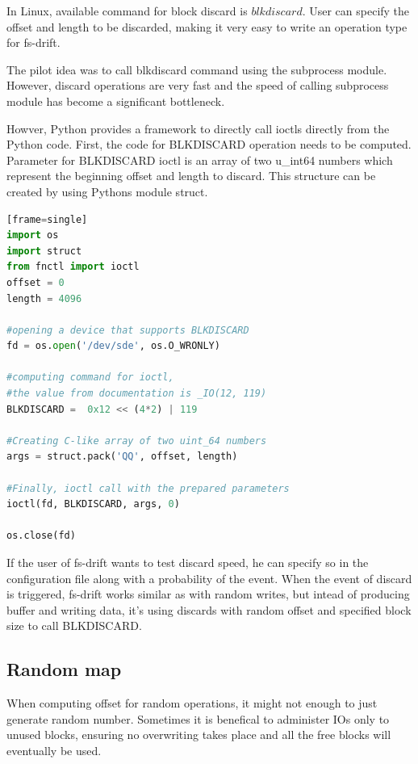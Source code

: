 \documentclass[
  color, %
  table, %
  lof,   %
  lot,   %
]{fithesis3}
\begin{document}
In Linux, available command for block discard is $blkdiscard$. User can specify the offset and length to be discarded, making it very easy to write an operation type for fs-drift.

The pilot idea was to call blkdiscard command using the subprocess module. However, discard operations are very fast and the speed of calling subprocess module has become a significant bottleneck.

Howver, Python provides a framework to directly call ioctls directly from the Python code. First, the code for BLKDISCARD operation needs to be computed. Parameter for BLKDISCARD ioctl is an array of two u\_int64 numbers which represent the beginning offset and length to discard. This structure can be created by using Pythons module struct.





\begin{lstlisting}[language=Python, caption={Using BLKDISCARD ioctl to discard first 4096 bytes from the beginning of the device},label={ex:blkdiscard}][frame=single]
import os
import struct
from fnctl import ioctl
offset = 0
length = 4096

#opening a device that supports BLKDISCARD
fd = os.open('/dev/sde', os.O_WRONLY)    

#computing command for ioctl,
#the value from documentation is _IO(12, 119)
BLKDISCARD =  0x12 << (4*2) | 119

#Creating C-like array of two uint_64 numbers
args = struct.pack('QQ', offset, length)

#Finally, ioctl call with the prepared parameters
ioctl(fd, BLKDISCARD, args, 0)

os.close(fd)
\end{lstlisting}


If the user of fs-drift wants to test discard speed, he can specify so in the configuration file along with a probability of the event. When the event of discard is triggered, fs-drift works similar as with random writes, but intead of producing buffer and writing data, it's using discards with random offset and specified block size to call BLKDISCARD.

\subsection{Random map}
When computing offset for random operations, it might not enough to just generate random number. Sometimes it is benefical to administer IOs only to unused blocks, ensuring no overwriting takes place and all the free blocks will eventually be used.
\end{document}
